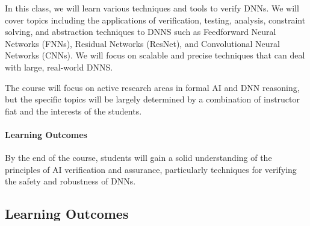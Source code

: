 \documentclass[11pt]{article}
\begin{document}
In this class, we will learn various techniques and tools to verify DNNs. We will cover topics including the applications
of verification, testing, analysis, constraint solving, and abstraction
techniques to DNNS such as Feedforward Neural Networks
(FNNs), Residual Networks (ResNet), and Convolutional Neural Networks
(CNNs). We will focus on scalable and precise techniques that can deal with large, real-world DNNS.

The course will focus on active research areas in formal AI and DNN reasoning,
but the specific topics will be largely determined by a
combination of instructor fiat and the interests of the students.

\paragraph{Learning Outcomes}


By the end of the course, students will gain a solid understanding of the principles of AI verification and assurance, particularly techniques for verifying the safety and robustness of DNNs.

\subsection{Learning Outcomes}
\end{document}
